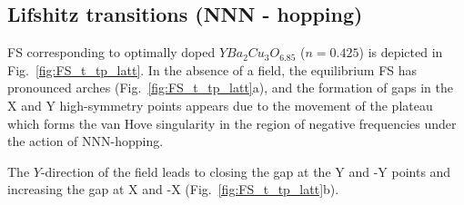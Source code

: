 \FloatBarrier

\subsection{Lifshitz transitions (NNN - hopping)}

FS corresponding to optimally doped $YBa_2Cu_3O_{6.85}$ ($n=0.425$) \cite{ANDERSEN19951573} is depicted in Fig.~\ref{fig:FS_t_tp_latt}. In the absence of a field, the equilibrium FS has pronounced arches (Fig.~\ref{fig:FS_t_tp_latt}a), and the formation of gaps in the X and Y high-symmetry points appears due to the movement of the plateau which forms the van Hove singularity in the region of negative frequencies under the action of NNN-hopping. 

The $Y$-direction of the field leads to closing the gap at the Y and -Y points and increasing the gap at X and -X (Fig.~\ref{fig:FS_t_tp_latt}b). 
